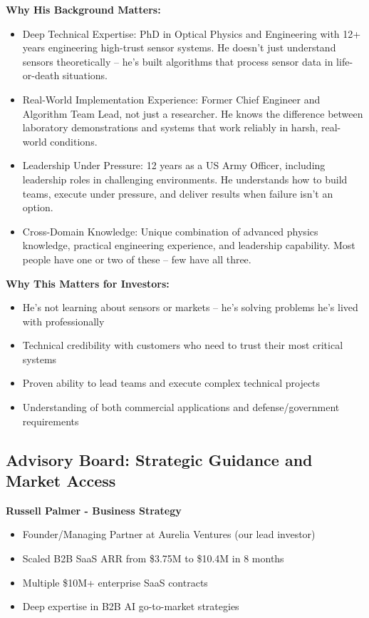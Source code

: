 \documentclass[11pt,letterpaper]{article}
\begin{document}
\textbf{Why His Background Matters:}
\begin{itemize}[leftmargin=10pt, itemsep=1pt]
    \item Deep Technical Expertise: PhD in Optical Physics and Engineering with 12+ years engineering high-trust sensor systems. He doesn't just understand sensors theoretically – he's built algorithms that process sensor data in life-or-death situations.
    \item Real-World Implementation Experience: Former Chief Engineer and Algorithm Team Lead, not just a researcher. He knows the difference between laboratory demonstrations and systems that work reliably in harsh, real-world conditions.
    \item Leadership Under Pressure: 12 years as a US Army Officer, including leadership roles in challenging environments. He understands how to build teams, execute under pressure, and deliver results when failure isn't an option.
    \item Cross-Domain Knowledge: Unique combination of advanced physics knowledge, practical engineering experience, and leadership capability. Most people have one or two of these – few have all three.
\end{itemize}

\textbf{Why This Matters for Investors:}
\begin{itemize}[leftmargin=10pt, itemsep=1pt]
    \item He's not learning about sensors or markets – he's solving problems he's lived with professionally
    \item Technical credibility with customers who need to trust their most critical systems
    \item Proven ability to lead teams and execute complex technical projects
    \item Understanding of both commercial applications and defense/government requirements
\end{itemize}

\subsection*{Advisory Board: Strategic Guidance and Market Access}

\textbf{Russell Palmer - Business Strategy}
\begin{itemize}[leftmargin=10pt, itemsep=1pt]
    \item Founder/Managing Partner at Aurelia Ventures (our lead investor)
    \item Scaled B2B SaaS ARR from \$3.75M to \$10.4M in 8 months
    \item Multiple \$10M+ enterprise SaaS contracts
    \item Deep expertise in B2B AI go-to-market strategies
\end{itemize}
\end{document}
